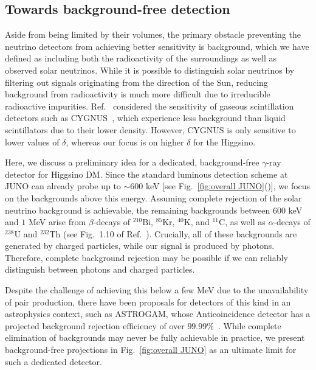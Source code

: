\documentclass[aps,prd,amsmath,amssymb,10pt,letterpaper,balancelastpage,showpacs,superscriptaddress,nofootinbib,floatfix,notitlepage,longbibliography,twocolumn
]{revtex4-2}
\begin{document}
\subsection{Towards background-free detection\label{sec:BGF}}

Aside from being limited by their volumes, the primary obstacle preventing the neutrino detectors from achieving better sensitivity is background, which we have defined as including both the radioactivity of the surroundings as well as observed solar neutrinos. While it is possible to distinguish solar neutrinos by filtering out signals originating from the direction of the Sun, reducing background from radioactivity is much more difficult due to irreducible radioactive impurities. Ref.~\cite{Luminous} considered the sensitivity of gaseous scintillation detectors such as CYGNUS~\cite{CYGNUS}, which experience less background than liquid scintillators due to their lower density. However, CYGNUS is only sensitive to lower values of $\delta$, whereas our focus is on higher $\delta$ for the Higgsino.

Here, we discuss a preliminary idea for a dedicated, background-free $\gamma$-ray detector for Higgsino DM. Since the standard luminous detection scheme at JUNO can already probe up to $\sim 600$ keV [see Fig.~\ref{fig:overall JUNO}()], we focus on the backgrounds above this energy. Assuming complete rejection of the solar neutrino background is achievable, the remaining backgrounds between $600$ keV and $1$ MeV arise from $\beta$-decays of ${}^{210}\text{Bi}$, ${}^{85}\text{Kr}$, ${}^{40}\text{K}$, and ${}^{11}\text{C}$, as well as $\alpha$-decays of ${}^{238}\text{U}$ and ${}^{232}\text{Th}$ (see Fig.~1.10 of Ref.~\cite{JUNO_Conceptual}). Crucially, all of these backgrounds are generated by charged particles, while our signal is produced by photons. Therefore, complete background rejection may be possible if we can reliably distinguish between photons and charged particles.

Despite the challenge of achieving this below a few MeV due to the unavailability of pair production, there have been proposals for detectors of this kind in an astrophysics context, such as ASTROGAM, whose Anticoincidence detector has a projected background rejection efficiency of over $99.99\%$~\cite{Astrogam}. 
While complete elimination of backgrounds may never be fully achievable in practice, we present background-free projections in Fig.~\ref{fig:overall JUNO} as an ultimate limit for such a dedicated detector.
\end{document}
